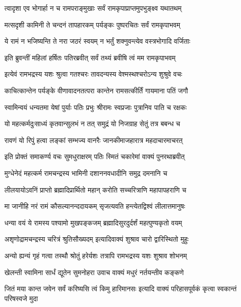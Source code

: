 \twolineshloka
{त्वादृशा एव भोगार्हा न च रामपराङ्मुखाः}
{सर्वं रामकृपाप्राप्तमुपभुङ्क्ष्व यथातथम्}%

\twolineshloka
{मत्सदृशी कामिनी ते चन्दनं तापहारकम्}
{पर्यङ्कः पुष्परचितः सर्वं रामकृपाभवम्}%

\twolineshloka
{ये रामं न भजिष्यन्ति ते नरा जठरं स्वयम्}
{न भर्तुं शक्नुवन्त्येव वस्त्रभोगादि वर्जिताः}%

\twolineshloka
{इति ब्रुवन्तीं महिलां हर्षितः पतिरब्रवीत्}
{सर्वं तथ्यं ब्रवीषि त्वं मम रामकृपाभवम्}%

\twolineshloka
{इत्येवं रामभद्रस्य यशः श्रुत्वा गतश्चरः}
{तावदन्यस्य वेश्मस्थश्चरोऽन्य शुश्रुवे वचः}%

\twolineshloka
{काचित्कान्तेन पर्यङ्के वीणावादनतत्परा}
{कान्तेन रामसत्कीर्तिं गायमाना पतिं जगौ}%

\twolineshloka
{स्वामिन्वयं धन्यतमा येषां पुर्याः पतिः प्रभुः}
{श्रीरामः स्वप्रजाः पुत्रानिव पाति च रक्षकः}%

\twolineshloka
{यो महत्कर्मदुःसाध्यं कृतवान्सुलभं न तत्}
{समुद्रं यो निजग्राह सेतुं तत्र बबन्ध च}%

\twolineshloka
{रावणं यो रिपुं हत्वा लङ्कां सम्भज्य वानरैः}
{जानकीमाजहारात्र महदाचारमाचरत्}%

\twolineshloka
{इति प्रोक्तं समाकर्ण्य वचः सुमधुराक्षरम्}
{पतिः स्मितं चकारेमां वाक्यं पुनरथाब्रवीत्}%

\twolineshloka
{मुग्धेनेदं महत्कर्म रामचन्द्रस्य भामिनी}
{दशाननवधादीनि समुद्र दमनानि च}%

\twolineshloka
{लीलयायोऽवनिं प्राप्तो ब्रह्मादिप्रार्थितो महान्}
{करोति सच्चरित्राणि महापापहराणि च}%

\twolineshloka
{मा जानीहि नरं रामं कौसल्यानन्ददायकम्}
{सृजत्यवति हन्त्येतद्विश्वं लीलात्तमानुषः}%

\twolineshloka
{धन्या वयं ये रामस्य पश्यामो मुखपङ्कजम्}
{ब्रह्मादिसुरदुर्दर्शं महत्पुण्यकृतो वयम्}%

\twolineshloka
{अशृणोद्रामचन्द्रस्य चरित्रं श्रुतिसौख्यदम्}
{इत्यादिवाक्यं शुश्राव चारो द्वारिस्थितो मुहुः}%

\twolineshloka
{अन्यो ह्यन्यं गृहं गत्वा तस्थौ श्रोतुं हरेर्यशः}
{तत्रापि रामभद्रस्य यशः शुश्राव शोभनम्}%

\twolineshloka
{खेलन्ती स्वामिना सार्धं द्यूतेन सुमनोहरा}
{उवाच वाक्यं मधुरं नर्तयन्तीव कङ्कणे}%

\fourlineindentedshloka
{जितं मया कान्त जवेन सर्वं}
{करिष्यसि त्वं किमु हारिमानसः}
{इत्यादि वाक्यं परिहासपूर्वकं}
{कृत्वा स्वकान्तं परिषस्वजे मुदा}%

